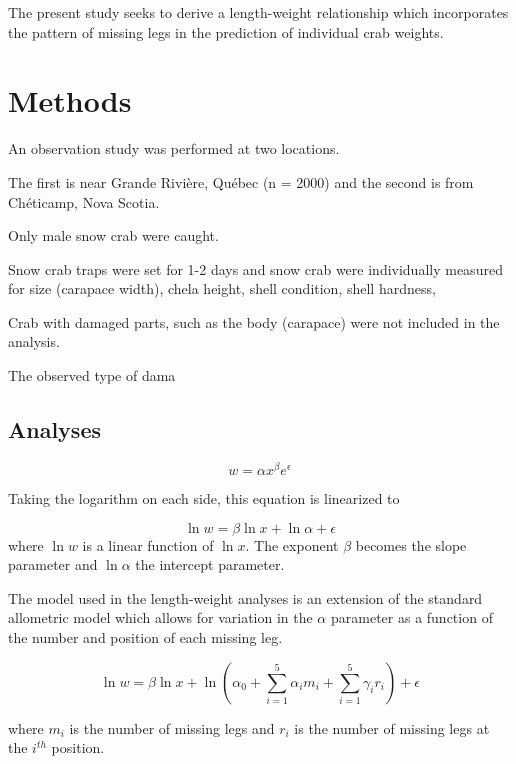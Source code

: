 \documentclass[letterpaper,10pt]{article}
\begin{document}
The present study seeks to derive a length-weight relationship which incorporates the pattern of missing legs in the prediction of individual crab weights.


\section{Methods}


An observation study was performed at two locations.

The first is near Grande Rivière, Québec (n = 2000) and the second is from Chéticamp, Nova Scotia.

Only male snow crab were caught.

Snow crab traps were set for 1-2 days and snow crab were individually measured for size (carapace width), chela height, shell condition, shell hardness, 

Crab with damaged parts, such as the body (carapace) were not included in the analysis.

The observed type of dama

\subsection{Analyses}

\begin{equation}
   w = \alpha x^\beta e^\epsilon 
\end{equation}

Taking the logarithm on each side, this equation is linearized to 

\begin{equation}
   \ln w = \beta \ln x + \ln \alpha + \epsilon
\end{equation}
where $\ln w$ is a linear function of $\ln x$. The exponent $\beta$ becomes the slope parameter and $\ln \alpha$ the intercept parameter.

The model used in the length-weight analyses is an extension of the standard allometric model which allows for variation in the $\alpha$ parameter as a function of the number and position of each missing leg.

\begin{equation}
   \ln w = \beta \ln x + \ln{\left(\alpha_0 + \sum_{i=1}^{5}{\alpha_i m_i} 
                             + \sum_{i=1}^{5}{\gamma_i r_i}\right)} + \epsilon
\end{equation}

where $m_i$ is the number of missing legs and $r_i$ is the number of missing legs at the $i^{th}$ position.
\end{document}
